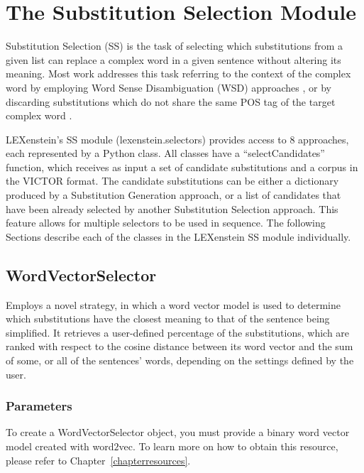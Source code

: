 \chapter{The Substitution Selection Module}
\label{selectors}

Substitution Selection (SS) is the task of selecting which substitutions from a given list can replace a complex word in a given sentence without altering its meaning. Most work addresses this task referring to the context of the complex word by employing Word Sense Disambiguation (WSD) approaches \cite{Sedding04,Nunes2013}, or by discarding substitutions which do not share the same POS tag of the target complex word \cite{Yamamoto2013,Paetzold2013}.

LEXenstein's SS module (lexenstein.selectors) provides access to $8$ approaches, each represented by a Python class. All classes have a ``selectCandidates'' function, which receives as input a set of candidate substitutions and a corpus in the VICTOR format. The candidate substitutions can be either a dictionary produced by a Substitution Generation approach, or a list of candidates that have been already selected by another Substitution Selection approach. This feature allows for multiple selectors to be used in sequence. The following Sections describe each of the classes in the LEXenstein SS module individually.







\section{WordVectorSelector}

Employs a novel strategy, in which a word vector model is used to determine which substitutions have the closest meaning to that of the sentence being simplified. It retrieves a user-defined percentage of the substitutions, which are ranked with respect to the cosine distance between its word vector and the sum of some, or all of the sentences' words, depending on the settings defined by the user.


\subsection{Parameters}

To create a WordVectorSelector object, you must provide a binary word vector model created with word$2$vec. To learn more on how to obtain this resource, please refer to Chapter~\ref{chapterresources}.

